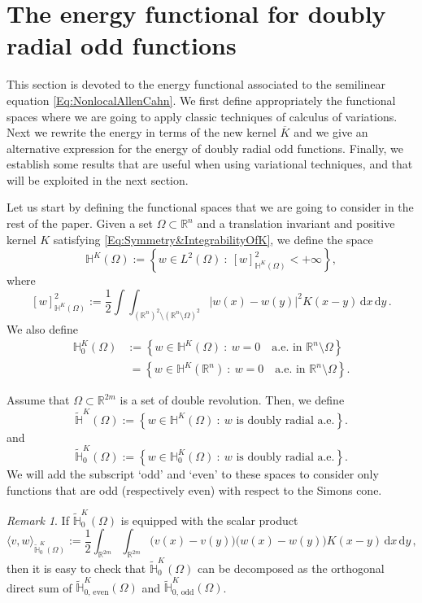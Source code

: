 \documentclass[12pt,reqno]{amsart}
\theoremstyle{definition}
\theoremstyle{remark}
\newtheorem{remark}[theorem]{Remark}
\newcommand{\con}[1]{\mathbb{#1}}
\newcommand{\R}{\con{R}} %
\renewcommand{\H}{\con{H}}
\renewcommand{\d}{\,\mathrm{d}} %
\newcommand{\setcond}[2]{\left \{ #1 \ : \ #2  \right \}}
\numberwithin{equation}{section}
\begin{document}
\section{The energy functional for doubly radial odd functions}
\label{Sec:EnergyForOddF}


This section is devoted to the energy functional associated to the semilinear equation \eqref{Eq:NonlocalAllenCahn}. We first define appropriately the functional spaces where we are going to apply classic techniques of calculus of variations. Next we rewrite the energy in terms of the new kernel $\overline{K}$ and we give an alternative expression for the energy of doubly radial odd functions. Finally, we establish some results that are useful when using variational techniques, and that will be exploited in the next section.


Let us start by defining the functional spaces that we are going to consider in the rest of the paper. Given a set $\Omega \subset \R^n$ and a translation invariant and positive kernel $K$ satisfying \eqref{Eq:Symmetry&IntegrabilityOfK}, we define the space
$$
\H^K(\Omega) := \setcond{w \in L^2(\Omega)}{[w]^2_{\H^K(\Omega)} < + \infty},
$$
where
$$
[w]^2_{\H^K(\Omega)} := \dfrac{1}{2}\int\int_{(\R^{n})^2 \setminus (\R^n\setminus\Omega)^2} |w(x) - w(y)|^2 K(x-y) \d x \d y\,.
$$
We also define
\begin{align*}
\H^K_0(\Omega) &:= \setcond{w \in \H^K(\Omega)}{ w = 0 \quad \textrm{a.e. in } \R^n \setminus \Omega} \\
&\ = \setcond{w \in \H^K(\R^n)}{ w = 0 \quad \textrm{a.e. in } \R^n \setminus \Omega}.
\end{align*}

Assume that $\Omega \subset \R^{2m}$ is a set of double revolution. Then, we define
$$
\widetilde{\H}^K(\Omega) := \setcond{w \in \H^K(\Omega)}{w \textrm{ is doubly radial a.e.}}.
$$
and
$$
\widetilde{\H}^K_0(\Omega) := \setcond{w \in \H^K_0(\Omega)}{w \textrm{ is doubly radial a.e.}}.
$$
We will add the subscript `odd' and `even' to these spaces to consider only functions that are odd (respectively even) with respect to the Simons cone.


\begin{remark}
	\label{Remark:DecompositionHK}
	If $\widetilde{\H}^K_0(\Omega)$ is equipped with the scalar product
	$$
	\langle v,w \rangle_{\widetilde{\H}^K_0(\Omega)} := \dfrac{1}{2}\int_{\R^{2m}} \int_{\R^{2m}}  \big(v(x) - v(y)\big)\big(w(x) - w(y)\big) K(x-y) \d x \d y\,,
	$$
	then it is easy to check that $\widetilde{\H}^K_0(\Omega)$ can be decomposed as the orthogonal direct sum of $\widetilde{\H}^K_{0,\, \mathrm{even}}(\Omega)$ and $\widetilde{\H}^K_{0,\,\mathrm{odd}}(\Omega)$.
\end{remark}
\end{document}
